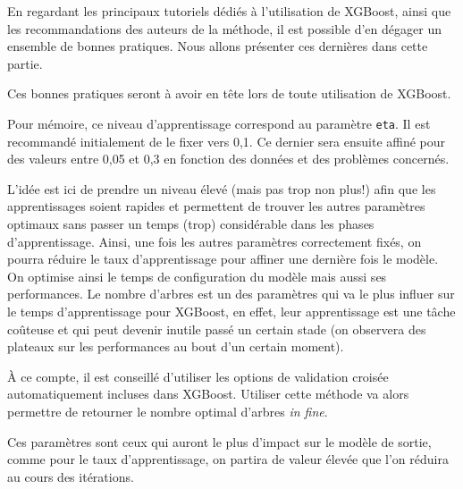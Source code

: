 \label{sec:bonnes-pratiques}
En regardant les principaux tutoriels dédiés à l'utilisation de XGBoost, ainsi que les recommandations des auteurs de la méthode, il est possible d'en dégager un ensemble de bonnes pratiques. Nous allons présenter ces dernières dans cette partie.

Ces bonnes pratiques seront à avoir en tête lors de toute utilisation de XGBoost.

Pour mémoire, ce niveau d'apprentissage correspond au paramètre \texttt{eta}. Il est recommandé initialement de le fixer vers 0,1. Ce dernier sera ensuite affiné pour des valeurs entre 0,05 et 0,3 en fonction des données et des problèmes concernés.

L'idée est ici de prendre un niveau élevé (mais pas trop non plus!) afin que les apprentissages soient rapides et permettent de trouver les autres paramètres optimaux sans passer un temps (trop) considérable dans les phases d'apprentissage. Ainsi, une fois les autres paramètres correctement fixés, on pourra réduire le taux d'apprentissage pour affiner une dernière fois le modèle. On optimise ainsi le temps de configuration du modèle mais aussi ses performances.
Le nombre d'arbres est un des paramètres qui va le plus influer sur le temps d'apprentissage pour XGBoost, en effet, leur apprentissage est une tâche coûteuse et qui peut devenir inutile passé un certain stade (on observera des plateaux sur les performances au bout d'un certain moment).

À ce compte, il est conseillé d'utiliser les options de validation croisée automatiquement incluses dans XGBoost. Utiliser cette méthode va alors permettre de retourner le nombre optimal d'arbres \textit{in fine}.

Ces paramètres sont ceux qui auront le plus d'impact sur le modèle de sortie, comme pour le taux d'apprentissage, on partira de valeur élevée que l'on réduira au cours des itérations.

